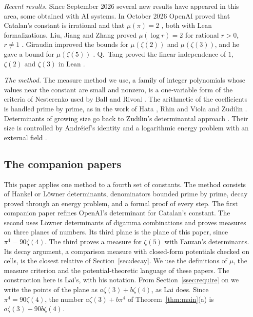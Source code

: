 \documentclass[11pt]{amsart}
\theoremstyle{definition}
\theoremstyle{remark}
\numberwithin{equation}{section}
\begin{document}
\emph{Recent results.} Since September 2026 several new results have appeared in this area, some obtained with AI
systems. In October 2026 OpenAI proved that Catalan's constant is irrational \cite{OpenAI2026} and that $\mu(\pi)=2$
\cite{OpenAIPi2026}, both with Lean formalizations. Liu, Jiang and Zhang proved $\mu(\log r)=2$ for rational $r>0$,
$r\ne1$ \cite{LiuJiangZhang26}. Giraudin improved the bounds for $\mu(\zeta(2))$ and $\mu(\zeta(3))$, and he gave
a bound for $\mu(\zeta(5))$ \cite{Giraudin26,Giraudin26z3,Giraudin26z5}. Q.~Tang proved the linear independence of $1$,
$\zeta(2)$ and $\zeta(3)$ in Lean \cite{Tang26}.

\emph{The method.} The measure method we use, a family of integer polynomials whose values near the constant are
small and nonzero, is a one-variable form of the criteria of Nesterenko \cite{Nesterenko85} used by Ball and Rivoal
\cite{BallRivoal01}. The arithmetic of the coefficients is handled prime by prime, as in the work of Hata
\cite{Hata93}, Rhin and Viola \cite{RhinViola96,RhinViola01} and Zudilin \cite{Zudilin04}. Determinants of growing
size go back to Zudilin's determinantal approach \cite{Zudilin}. Their size is controlled by Andr\'eief's identity
\cite{Forrester2018Andreief} and a logarithmic energy problem with an external field \cite{SaffTotik}.

\subsection{The companion papers}
This paper applies one method to a fourth set of constants. The method consists of Hankel or L\"owner determinants,
denominators bounded prime by prime, decay proved through an energy problem, and a formal proof of every step. The
first companion paper \cite{Litsey2026} refines OpenAI's determinant for Catalan's constant. The second
\cite{Litsey2026b} uses L\"owner determinants of digamma combinations and proves measures on three planes of numbers.
Its third plane is the plane of this paper, since $\pi^4=90\zeta(4)$. The third \cite{Litsey2026c} proves a measure
for $\zeta(5)$ with Fauzan's determinants. Its decay argument, a comparison measure with closed-form potentials checked
on cells, is the closest relative of Section~\ref{sec:decay}. We use the definitions of $\mu$, the measure criterion
and the potential-theoretic language of these papers. The construction here is Lai's, with his notation. From Section~\ref{ssec:require} on we write the
points of the plane as $a\zeta(3)+b\zeta(4)$, as Lai does. Since $\pi^4=90\zeta(4)$, the number $a\zeta(3)+b\pi^4$ of
Theorem~\ref{thm:main}(a) is $a\zeta(3)+90b\zeta(4)$.
\end{document}

